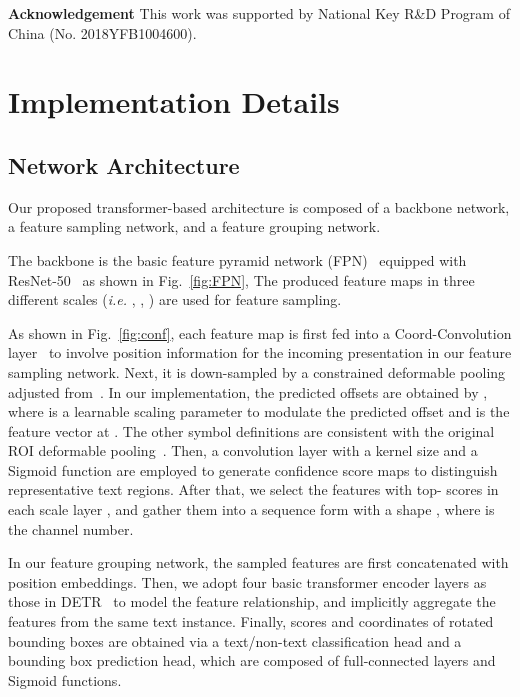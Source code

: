 \documentclass[10pt,twocolumn,letterpaper]{article}
\begin{document}
\noindent \textbf{Acknowledgement} This work was supported by National
Key R\&D Program of China (No. 2018YFB1004600).

{\small


}

\clearpage


\appendix

\section{Implementation Details}


\subsection{Network Architecture}
Our proposed transformer-based architecture is composed of a backbone network, a feature sampling network, and a feature grouping network.

The backbone is the basic feature pyramid network (FPN)~\cite{FPN} equipped with ResNet-50~\cite{ResNet} as shown in Fig.~\ref{fig:FPN}, 
The produced feature maps in three different scales (\emph{i.e.} , , ) are used for feature sampling.

As shown in Fig.~\ref{fig:conf}, each feature map is first fed into a Coord-Convolution layer~\cite{Coord} to involve position information for the incoming presentation in our feature sampling network.
Next, it is down-sampled by a constrained deformable pooling adjusted from~\cite{DCN}.
In our implementation, the predicted offsets are obtained by , where  is a learnable scaling parameter to modulate the predicted offset and  is the feature vector at . The other symbol definitions are consistent with the original ROI deformable pooling~\cite{DCN}.
Then, a convolution layer with a  kernel size and a Sigmoid function are employed to generate confidence score maps to distinguish representative text regions.
After that, we select the features with top- scores in each scale layer , and gather them into a sequence form with a shape , where  is the channel number.

In our feature grouping network, the sampled features are first concatenated with position embeddings.
Then, we adopt four basic transformer encoder layers as those in DETR~\cite{carion2020detr} to model the feature relationship, and implicitly aggregate the features from the same text instance.
Finally, scores and coordinates of rotated bounding boxes are obtained via a text/non-text classification head and a bounding box prediction head, which are composed of full-connected layers and Sigmoid functions.
\end{document}
